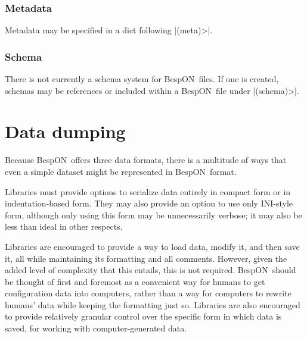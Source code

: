 \documentclass[11pt]{article}
\newcommand{\bespon}{BespON}
\begin{document}
\subsubsection{Metadata}

Metadata may be specified in a dict following |(meta)>|.

\subsubsection{Schema}

There is not currently a schema system for \bespon\ files.  If one is created, schemas may be references or included within a \bespon\ file under |(schema)>|.



\section{Data dumping}

Because \bespon\ offers three data formats, there is a multitude of ways that even a simple dataset might be represented in \bespon\ format.

Libraries must provide options to serialize data entirely in compact form or in indentation-based form.  They may also provide an option to use only INI-style form, although only using this form may be unnecessarily verbose; it may also be less than ideal in other respects.

Libraries are encouraged to provide a way to load data, modify it, and then save it, all while maintaining its formatting and all comments.  However, given the added level of complexity that this entails, this is not required.  \bespon\ should be thought of first and foremost as a convenient way for humans to get configuration data into computers, rather than a way for computers to rewrite humans' data while keeping the formatting just so.  Libraries are also encouraged to provide relatively granular control over the specific form in which data is saved, for working with computer-generated data.
\end{document}
